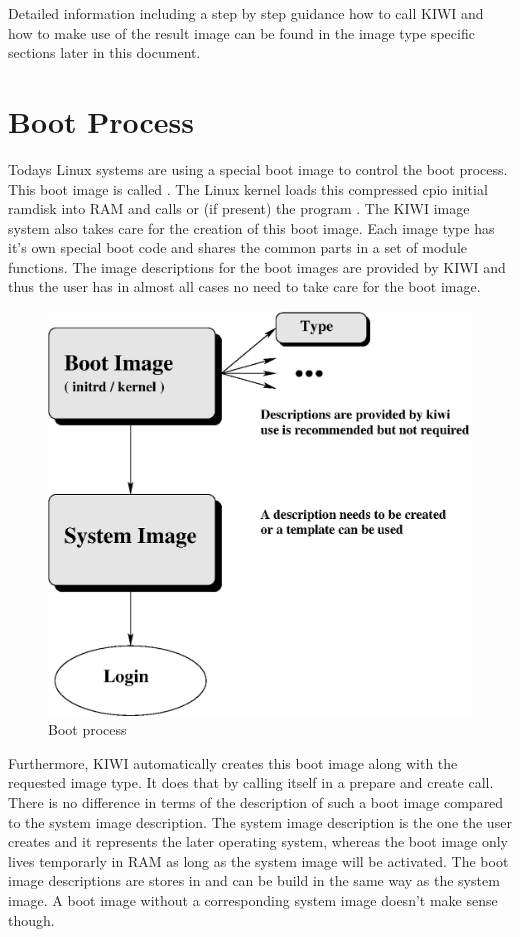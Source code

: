 Detailed information including a step by step guidance how to call
KIWI and how to make use of the result image can be found in the image
type specific sections later in this document.

\section{Boot Process}
Todays Linux systems are using a special boot image to control the
boot process. This boot image is called . The Linux
kernel loads this compressed cpio initial ramdisk into RAM and 
calls  or (if present) the program . The
KIWI image system also takes care for the creation of this boot image.
Each image type has it's own special boot code and shares the common
parts in a set of module functions. The image descriptions for the
boot images are provided by KIWI and thus the user has in almost all
cases no need to take care for the boot image.

\begin{figure}[h]
\centering
\includegraphics[scale=0.5]{pictures/activation.eps}
\caption{Boot process}
\label{fig:initrd}
\end{figure}

Furthermore, KIWI automatically creates this boot image along with
the requested image type. It does that by calling itself in a prepare
and create call. There is no difference in terms of the description
of such a boot image compared to the system image description. The
system image description is the one the user creates and it
represents the later operating system, whereas the boot image only
lives temporarly in RAM as long as the system image will be activated.
The boot image descriptions are stores in 
and can be build in the same way as the system image. A boot image
without a corresponding system image doesn't make sense though.

